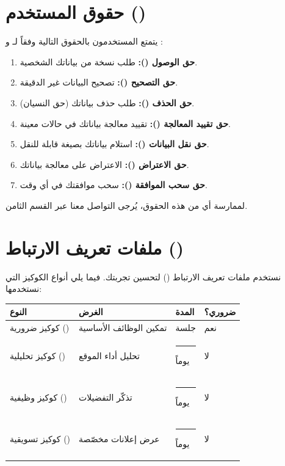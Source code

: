 \documentclass[12pt,a4paper]{article}
\begin{document}
\section{حقوق المستخدم ()}
\label{sec:rights}
يتمتع المستخدمون بالحقوق التالية وفقاً لـ  و :
\begin{enumerate}
    \item \textbf{حق الوصول ():} طلب نسخة من بياناتك الشخصية.
    \item \textbf{حق التصحيح ():} تصحيح البيانات غير الدقيقة.
    \item \textbf{حق الحذف ():} طلب حذف بياناتك (حق النسيان).
    \item \textbf{حق تقييد المعالجة ():} تقييد معالجة بياناتك في حالات معينة.
    \item \textbf{حق نقل البيانات ():} استلام بياناتك بصيغة قابلة للنقل.
    \item \textbf{حق الاعتراض ():} الاعتراض على معالجة بياناتك.
    \item \textbf{حق سحب الموافقة ():} سحب موافقتك في أي وقت.
\end{enumerate}

\noindent لممارسة أي من هذه الحقوق، يُرجى التواصل معنا عبر القسم الثامن.

\section{ملفات تعريف الارتباط ()}
\label{sec:cookies}
نستخدم ملفات تعريف الارتباط () لتحسين تجربتك. فيما يلي أنواع الكوكيز التي نستخدمها:

\begin{table}[H]
\centering
\renewcommand{\arraystretch}{1.5}
\begin{tabularx}{\textwidth}{L{3.5cm} X C{2.5cm} C{2.5cm}}
\toprule
\textbf{النوع} & \textbf{الغرض} & \textbf{المدة} & \textbf{ضروري؟} \\
\midrule
كوكيز ضرورية () & تمكين الوظائف الأساسية & جلسة & نعم \\
كوكيز تحليلية () & تحليل أداء الموقع & \rule{1.5cm}{0.4pt} يوماً & لا \\
كوكيز وظيفية () & تذكّر التفضيلات & \rule{1.5cm}{0.4pt} يوماً & لا \\
كوكيز تسويقية () & عرض إعلانات مخصّصة & \rule{1.5cm}{0.4pt} يوماً & لا \\
\bottomrule
\end{tabularx}
\end{table}
\end{document}
